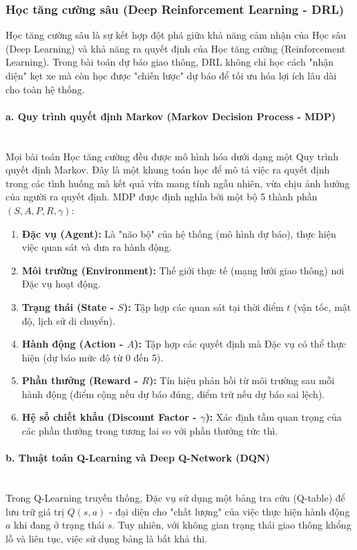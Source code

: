 \subsubsection{Học tăng cường sâu (Deep Reinforcement Learning - DRL)}
Học tăng cường sâu là sự kết hợp đột phá giữa khả năng cảm nhận của Học sâu (Deep Learning) và khả năng ra quyết định của Học tăng cường (Reinforcement Learning). Trong bài toán dự báo giao thông, DRL không chỉ học cách "nhận diện" kẹt xe mà còn học được "chiến lược" dự báo để tối ưu hóa lợi ích lâu dài cho toàn hệ thống.

\paragraph{a. Quy trình quyết định Markov (Markov Decision Process - MDP)} \mbox{} \\
Mọi bài toán Học tăng cường đều được mô hình hóa dưới dạng một Quy trình quyết định Markov. Đây là một khung toán học để mô tả việc ra quyết định trong các tình huống mà kết quả vừa mang tính ngẫu nhiên, vừa chịu ảnh hưởng của người ra quyết định. MDP được định nghĩa bởi một bộ 5 thành phần $(S, A, P, R, \gamma)$:
\begin{enumerate}
    \item \textbf{Đặc vụ (Agent):} Là "não bộ" của hệ thống (mô hình dự báo), thực hiện việc quan sát và đưa ra hành động.
    \item \textbf{Môi trường (Environment):} Thế giới thực tế (mạng lưới giao thông) nơi Đặc vụ hoạt động.
    \item \textbf{Trạng thái (State - $S$):} Tập hợp các quan sát tại thời điểm $t$ (vận tốc, mật độ, lịch sử di chuyển).
    \item \textbf{Hành động (Action - $A$):} Tập hợp các quyết định mà Đặc vụ có thể thực hiện (dự báo mức độ từ 0 đến 5).
    \item \textbf{Phần thưởng (Reward - $R$):} Tín hiệu phản hồi từ môi trường sau mỗi hành động (điểm cộng nếu dự báo đúng, điểm trừ nếu dự báo sai lệch).
    \item \textbf{Hệ số chiết khấu (Discount Factor - $\gamma$):} Xác định tầm quan trọng của các phần thưởng trong tương lai so với phần thưởng tức thì.
\end{enumerate}

\paragraph{b. Thuật toán Q-Learning và Deep Q-Network (DQN)} \mbox{} \\
Trong Q-Learning truyền thống, Đặc vụ sử dụng một bảng tra cứu (Q-table) để lưu trữ giá trị $Q(s, a)$ - đại diện cho "chất lượng" của việc thực hiện hành động $a$ khi đang ở trạng thái $s$. Tuy nhiên, với không gian trạng thái giao thông khổng lồ và liên tục, việc sử dụng bảng là bất khả thi.

